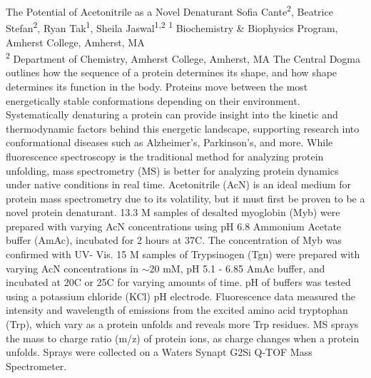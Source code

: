 {
\parskip=10pt    
\makeabstract
    {
    The Potential of Acetonitrile as a Novel Denaturant
    }
    {
    Sofia Cante\textsuperscript{2}, Beatrice Stefan\textsuperscript{2}, Ryan Tak\textsuperscript{1}, Sheila Jaswal\textsuperscript{1,2}
    }
    {
    \textsuperscript{1} Biochemistry \& Biophysics Program, Amherst College, Amherst, MA \\
\textsuperscript{2} Department of Chemistry, Amherst College, Amherst, MA
    }
    {
    The Central Dogma outlines how the sequence of a protein determines its shape, and how shape determines its function in the body. Proteins move between the most energetically stable conformations depending on their environment. Systematically denaturing a protein can provide insight into the kinetic and thermodynamic factors behind this energetic landscape, supporting research into conformational diseases such as Alzheimer's, Parkinson's, and more. While fluorescence spectroscopy is the traditional method for analyzing protein unfolding, mass spectrometry (MS) is better for analyzing protein dynamics under native conditions in real time. Acetonitrile (AcN) is an ideal medium for protein mass spectrometry due to its volatility, but it must first be proven to be a novel protein denaturant. 
    }
    {
    13.3 {\textmu}M samples of desalted myoglobin (Myb) were prepared with varying AcN concentrations using pH 6.8 Ammonium Acetate buffer (AmAc), incubated for 2 hours at 37{\textdegree}C.  The concentration of Myb was confirmed with UV- Vis. 15 {\textmu}M samples of Trypsinogen (Tgn) were prepared with varying AcN concentrations in $\sim$20 mM, pH 5.1 - 6.85 AmAc buffer, and incubated at 20{\textdegree}C or 25{\textdegree}C for varying amounts of time. pH of buffers was tested using a potassium chloride (KCl) pH electrode.  Fluorescence data measured the intensity and wavelength of emissions from the excited amino acid tryptophan (Trp), which vary as a protein unfolds and reveals more Trp residues. MS sprays the mass to charge ratio (m/z) of protein ions, as charge changes when a protein unfolds. Sprays were collected on a Waters Synapt G2Si Q-TOF Mass Spectrometer.
    }
    {
}}
